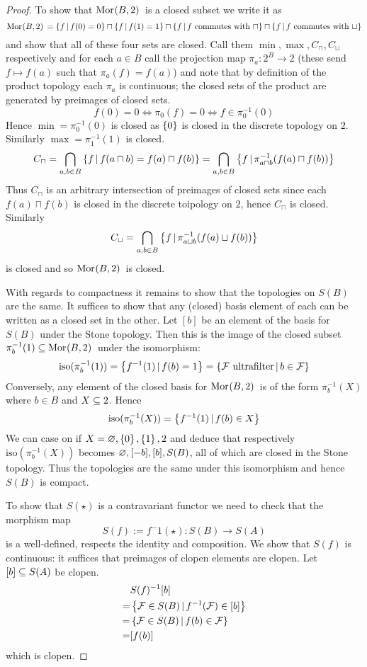 \begin{proof}
    To show that $\mathrm{Mor}_{}(B, 2)\,$ is a closed subset we write it as 
    \[\mathrm{Mor}_{}(B, 2)\, = \left\{f \,|\, f(0) = 0\right\} \sqcap \left\{f \,|\, f(1) = 1\right\}
        \sqcap \left\{f \,|\, f \text{ commutes with $\sqcap$}\right\} \sqcap 
        \left\{f \,|\, f \text{ commutes with $\sqcup$}\right\}\]
    and show that all of these four sets are closed.
    Call them $\min,\max,C_{\sqcap},C_\sqcup$ respectively and for each $a \in B$
    call the projection map $\pi_a : 2^B \to 2$ (these send $f \mapsto f(a)$
    such that $\pi_a(f) = f(a)$)
    and note that by definition of the product topology each 
    $\pi_a$ is continuous; 
    the closed sets of the product are generated by preimages of closed sets.
    \[f(0) = 0 \iff \pi_0(f) = 0 \iff f \in \pi_0^{-1}(0)\]
    Hence $\min = \pi_0^{-1}(0)$ is closed as $\left\{0\right\}$ 
    is closed in the discrete topology on $2$.
    Similarly $\max = \pi_1^{-1}(1)$ is closed.
    \[C_\sqcap = \bigcap_{a,b \in B} \left\{f \,|\, f(a \sqcap b) = f(a) \sqcap f(b)\right\}
    = \bigcap_{a,b \in B} \left\{f \,|\, \pi_{a \sqcap b}^{-1}(f(a) \sqcap f(b))\right\}\]
    Thus $C_\sqcap$ is an arbitrary intersection of preimages of closed sets 
    since each ${f(a) \sqcap f(b)}$ is closed in the discrete toipology on $2$,
    hence $C_\sqcap$ is closed. 
    Similarly 
    \[C_\sqcup = \bigcap_{a,b \in B} 
    \left\{f \,|\, \pi_{a \sqcup b}^{-1}(f(a) \sqcup f(b))\right\}\]
    is closed and so $\mathrm{Mor}_{}(B, 2)\,$ is closed.

    With regards to compactness it remains to show that the topologies 
    on $S(B)$ are the same.
    It suffices to show that any (closed) basis element of each can be written 
    as a closed set in the other.
    Let $[b]$ be an element of the basis for $S(B)$ under the Stone topology.
    Then this is the image of the closed subset 
    $\pi_b^{-1}(1) \subseteq \mathrm{Mor}_{}(B, 2)\,$ under the isomorphism:
    \[\mathrm{iso}(\pi_b^{-1}(1)) = \left\{f^{-1}(1) \,|\, f(b) = 1\right\}
    = \left\{\mathcal{F} \text{ ultrafilter} \,|\, b \in \mathcal{F}\right\}\]
    Conversely, 
    any element of the closed basis for $\mathrm{Mor}_{}(B, 2)\,$ is of the form 
    $\pi_b^{-1}(X)$ where $b \in B$ and $X \subseteq 2$.
    Hence 
    \[\mathrm{iso}(\pi_b^{-1}(X)) = \left\{f^{-1}(1) \,|\, f(b) \in X\right\}\]
    We can case on if $X = \varnothing, \left\{0\right\}, \left\{1\right\}, 2$ and deduce that 
    respectively $\mathrm{iso}(\pi_b^{-1}(X))$ 
    becomes $\varnothing, [- b], [b], S(B)$, 
    all of which are closed in the Stone topology.
    Thus the topologies are the same under this isomorphism and hence 
    $S(B)$ is compact.

    To show that $S(\star)$ 
    is a contravariant functor we need to check that the morphism map
    \[S(f) := f^-1(\star) : S(B) \to S(A)\]
    is a well-defined, respects the identity and composition. 
    We show that $S(f)$ is continuous: 
    it suffices that preimages of clopen elements are clopen.
    Let $[b] \subseteq S(A)$ be clopen. 
    \begin{align*}
        & S(f)^{-1}[b]\\
        =& \left\{\mathcal{F} \in S(B) \,|\, f^{-1}(\mathcal{F}) \in [b]\right\}\\
        =& \left\{\mathcal{F} \in S(B) \,|\, f(b) \in \mathcal{F}\right\}\\
        =& [f(b)]
    \end{align*}
    which is clopen.
\end{proof}

